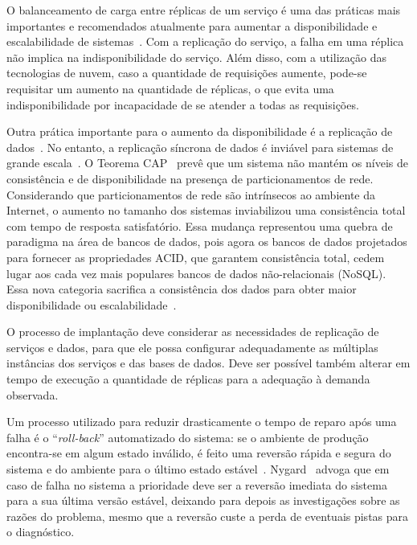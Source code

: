 \begin{description}
O balanceamento de carga entre réplicas de um serviço é uma das práticas mais importantes e 
recomendados atualmente para aumentar a disponibilidade e escalabilidade de sistemas~\cite{Amazon2012Practices}.
Com a replicação do serviço, a falha em uma réplica não implica na indisponibilidade
do serviço. Além disso, com a utilização das tecnologias de nuvem,
caso a quantidade de requisições aumente, pode-se requisitar um aumento na quantidade de réplicas,
o que evita uma indisponibilidade por incapacidade de se atender a todas as requisições.

Outra prática importante para o aumento da disponibilidade é a replicação de dados~\cite{Brewer2001GiantScale}.
No entanto, a replicação síncrona de dados é inviável para sistemas de grande escala~\cite{Helland2009Quicksand}.
O Teorema CAP~\cite{Brewer2012Cap} prevê que um sistema não mantém os níveis de consistência e de disponibilidade na presença de particionamentos de rede. Considerando que particionamentos de rede são intrínsecos ao ambiente da Internet, o aumento no tamanho dos sistemas inviabilizou uma consistência total com tempo de resposta satisfatório. 
Essa mudança representou uma quebra de paradigma na área de bancos de dados,
pois agora os bancos de dados projetados para fornecer as propriedades ACID,
que garantem consistência total, cedem lugar aos cada vez mais populares
bancos de dados não-relacionais (NoSQL).
Essa nova categoria sacrifica a consistência dos dados para obter maior disponibilidade ou escalabilidade~\cite{Cattell2011NoSql}.

O processo de implantação deve considerar as necessidades de replicação de serviços e dados,
para que ele possa configurar adequadamente as múltiplas instâncias dos serviços e das bases de dados.
Deve ser possível também alterar em tempo de execução a quantidade de réplicas para
a adequação à demanda observada.

Um processo utilizado para reduzir drasticamente o tempo de reparo após uma falha
é o ``\emph{roll-back}'' automatizado do sistema: se o ambiente de produção encontra-se em algum estado inválido, 
é feito uma reversão rápida e segura do sistema e do ambiente para 
o último estado estável~\cite{Hamilton2007InternetScale, Brewer2001GiantScale}. 
Nygard~\cite{Nygard2009Release} advoga que em caso de falha no sistema a prioridade deve ser 
a reversão imediata do sistema para a sua última versão estável, 
deixando para depois as investigações sobre as razões do problema, 
mesmo que a reversão custe a perda de eventuais pistas para o diagnóstico. 


\end{description}
